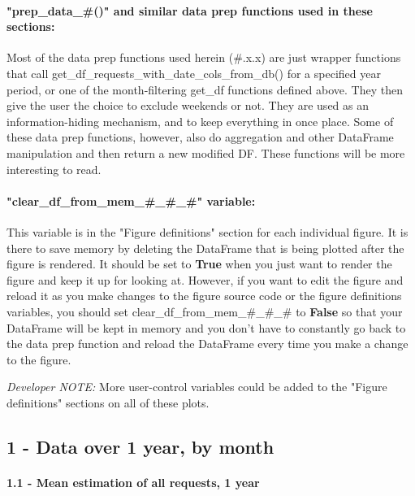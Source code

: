 \documentclass[11pt]{article}
\begin{document}
\paragraph{"prep\_data\_\#()" and similar data prep functions used in
these
sections:}\label{prep_data_-and-similar-data-prep-functions-used-in-these-sections}

Most of the data prep functions used herein (\#.x.x) are just wrapper
functions that call get\_df\_requests\_with\_date\_cols\_from\_db() for
a specified year period, or one of the month-filtering get\_df functions
defined above. They then give the user the choice to exclude weekends or
not. They are used as an information-hiding mechanism, and to keep
everything in once place. Some of these data prep functions, however,
also do aggregation and other DataFrame manipulation and then return a
new modified DF. These functions will be more interesting to read.

\paragraph{"clear\_df\_from\_mem\_\#\_\#\_\#"
variable:}\label{clear_df_from_mem___-variable}

This variable is in the "Figure definitions" section for each individual
figure. It is there to save memory by deleting the DataFrame that is
being plotted after the figure is rendered. It should be set to
\textbf{True} when you just want to render the figure and keep it up for
looking at. However, if you want to edit the figure and reload it as you
make changes to the figure source code or the figure definitions
variables, you should set clear\_df\_from\_mem\_\#\_\#\_\# to
\textbf{False} so that your DataFrame will be kept in memory and you
don't have to constantly go back to the data prep function and reload
the DataFrame every time you make a change to the figure.

    \emph{Developer NOTE:} More user-control variables could be added to the
"Figure definitions" sections on all of these plots.

    \subsection{1 - Data over 1 year, by
month}\label{data-over-1-year-by-month}

    \paragraph{1.1 - Mean estimation of all requests, 1
year}\label{mean-estimation-of-all-requests-1-year}
\end{document}
